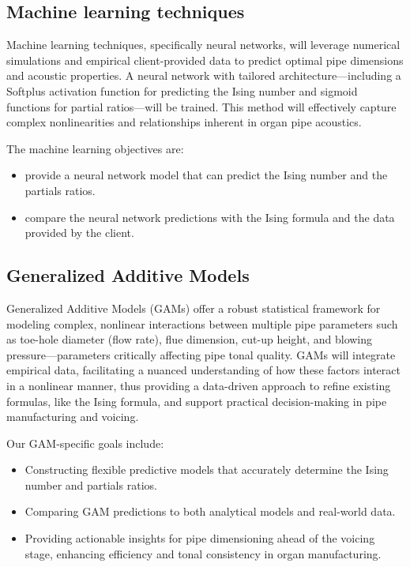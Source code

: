 \documentclass{psu-report}
\begin{document}
\subsection{Machine learning techniques}

Machine learning techniques, specifically neural networks, will leverage numerical simulations and empirical 
client-provided data to predict optimal pipe dimensions and acoustic properties. 
A neural network with tailored architecture—including a Softplus activation function for predicting the 
Ising number and sigmoid functions for partial ratios—will be trained. 
This method will effectively capture complex nonlinearities and relationships inherent in organ pipe acoustics.

The machine learning objectives are:
\begin{itemize}
    \item provide a neural network model that can predict the Ising number and
        the partials ratios.
    \item compare the neural network predictions with the Ising formula and the
        data provided by the client.
\end{itemize}

\subsection{Generalized Additive Models}

Generalized Additive Models (GAMs) offer a robust statistical framework for modeling complex, 
nonlinear interactions between multiple pipe parameters such as toe-hole diameter (flow rate), flue dimension,
cut-up height, and blowing pressure—parameters critically affecting pipe tonal quality. 
GAMs will integrate empirical data, facilitating a nuanced understanding of how these factors interact in a nonlinear 
manner, thus providing a data-driven approach to refine existing formulas, like the Ising formula, and support 
practical decision-making in pipe manufacturing and voicing.

Our GAM-specific goals include:
\begin{itemize}
    \item Constructing flexible predictive models that accurately determine the Ising number and partials ratios.
 \item Comparing GAM predictions to both analytical models and real-world data.
 \item Providing actionable insights for pipe dimensioning ahead of the voicing stage, enhancing efficiency 
    and tonal consistency in organ manufacturing.
\end{itemize}
\end{document}
